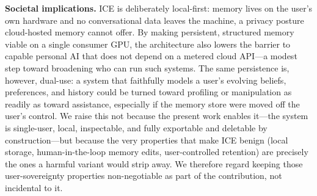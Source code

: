 \documentclass[11pt,a4paper]{article}
\begin{document}
\textbf{Societal implications.} ICE is deliberately local-first: memory lives on the user's own hardware and no conversational data leaves the machine, a privacy posture cloud-hosted memory cannot offer. By making persistent, structured memory viable on a single consumer GPU, the architecture also lowers the barrier to capable personal AI that does not depend on a metered cloud API---a modest step toward broadening who can run such systems. The same persistence is, however, dual-use: a system that faithfully models a user's evolving beliefs, preferences, and history could be turned toward profiling or manipulation as readily as toward assistance, especially if the memory store were moved off the user's control. We raise this not because the present work enables it---the system is single-user, local, inspectable, and fully exportable and deletable by construction---but because the very properties that make ICE benign (local storage, human-in-the-loop memory edits, user-controlled retention) are precisely the ones a harmful variant would strip away. We therefore regard keeping those user-sovereignty properties non-negotiable as part of the contribution, not incidental to it.
\end{document}
